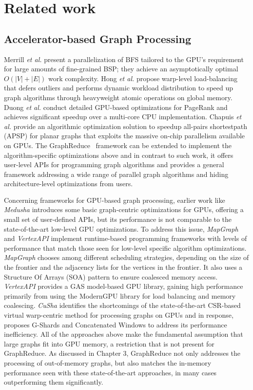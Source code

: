 \chapter{Related work}

\section{Accelerator-based Graph Processing}
 Merrill \textit{et al.}\cite{Merrill} present 
a parallelization of BFS tailored to the GPU's requirement for large amounts of fine-grained BSP; they achieve an asymptotically 
optimal $O(|V|+|E|)$ work complexity. Hong \textit{et al.}\cite{Hong} propose warp-level load-balancing that defers outliers 
and performs dynamic workload distribution to speed up graph algorithms through heavyweight atomic operations on global memory. 
Duong \textit{et al.} \cite{Duong} conduct detailed GPU-based optimizations for PageRank and achieves significant speedup over 
a multi-core CPU implementation. Chapuis \textit{et al.} \cite{ASSP} provide an algorithmic optimization solution to speedup 
all-pairs shortestpath (APSP) for planar graphs that exploits the massive on-chip parallelism available on GPUs. 
The GraphReduce~\cite{GR} framework can be extended to implement the algorithm-specific optimizations above and in contrast to such work, it offers
user-level APIs for programming graph algorithms and provides a general framework addressing a wide range of parallel graph algorithms 
and hiding architecture-level optimizations from users.

Concerning frameworks for GPU-based graph processing, earlier work like \textit{Medusha} \cite{medusa} introduces some basic
graph-centric optimizations for GPUs, offering a small set of user-defined APIs, but its performance is not comparable to the
state-of-the-art low-level GPU optimizations. To address this issue, \textit{MapGraph} \cite{mapgraph} and \textit{VertexAPI}\cite{vertexapi}
implement runtime-based programming frameworks with levels of performance that match those seen for low-level specific algorithm optimizations. 
\textit{MapGraph} chooses among different scheduling strategies, depending on the size of the frontier and the adjacency lists 
for the vertices in the frontier. It also uses a Structure Of Arrays (SOA) pattern to ensure coalesced memory access. 
\textit{VertexAPI} provides a GAS model-based GPU library, gaining high performance primarily from using the 
ModernGPU \cite{moderngpu} library for load balancing and memory coalescing. \textit{CuSha} \cite{cusha} identifies the shortcomings 
of the state-of-the-art CSR-based virtual warp-centric method for processing graphs on GPUs and in response, proposes G-Shards and 
Concatenated Windows to address its performance inefficiency. All of the approaches above make the fundamental assumption that 
large graphs fit into GPU memory, a restriction that is not present for GraphReduce. As discussed in Chapter 3, GraphReduce 
not only addresses the processing of out-of-memory graphs, but also matches the in-memory performance seen with these state-of-the-art 
approaches, in many cases outperforming them significantly. 

